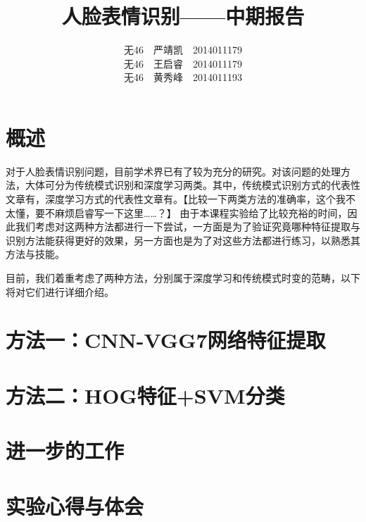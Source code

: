 \documentclass[UTF8]{ctexart}
\begin{document}
\title{人脸表情识别——中期报告}
\author{无46\ \ 严靖凯\ \ 2014011179\\ 无46\ \ 王启睿\ \ 2014011179\\ 无46\ \ 黄秀峰\ \ 2014011193}
\maketitle

\section{概述}


对于人脸表情识别问题，目前学术界已有了较为充分的研究。对该问题的处理方法，大体可分为传统模式识别和深度学习两类。其中，传统模式识别方式的代表性文章有\cite{}，深度学习方式的代表性文章有\cite{}。【比较一下两类方法的准确率，这个我不太懂，要不麻烦启睿写一下这里……？】
由于本课程实验给了比较充裕的时间，因此我们考虑对这两种方法都进行一下尝试，一方面是为了验证究竟哪种特征提取与识别方法能获得更好的效果，另一方面也是为了对这些方法都进行练习，以熟悉其方法与技能。

目前，我们着重考虑了两种方法，分别属于深度学习和传统模式时变的范畴，以下将对它们进行详细介绍。

\section{方法一：CNN-VGG7网络特征提取} %




\section{方法二：HOG特征+SVM分类}



\section{进一步的工作}


\section{实验心得与体会}




\end{document}
